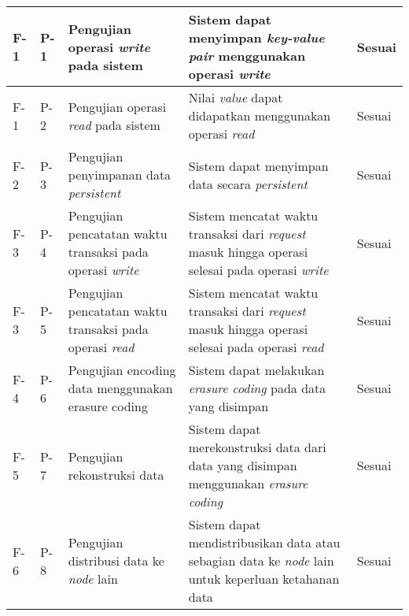 \begin{longtable}{|p{2cm}|p{2cm}|p{3cm}|p{3cm}|p{2cm}|}
	F-1                              & P-1          & Pengujian operasi \textit{write} pada sistem                     & Sistem dapat menyimpan \textit{key-value pair} menggunakan operasi \textit{write}                                                     & Sesuai                         \\ \hline
	F-1                              & P-2          & Pengujian operasi \textit{read} pada sistem                      & Nilai \textit{value} dapat didapatkan menggunakan operasi \textit{read}                                                               & Sesuai                         \\ \hline
	F-2                              & P-3          & Pengujian penyimpanan data \textit{persistent}                   & Sistem dapat menyimpan data secara \textit{persistent}                                                                                & Sesuai                         \\ \hline
	F-3                              & P-4          & Pengujian pencatatan waktu transaksi pada operasi \textit{write} & Sistem mencatat waktu transaksi dari \textit{request} masuk hingga operasi selesai pada operasi \textit{write}                        & Sesuai                         \\ \hline
	F-3                              & P-5          & Pengujian pencatatan waktu transaksi pada operasi \textit{read}  & Sistem mencatat waktu transaksi dari \textit{request} masuk hingga operasi selesai pada operasi \textit{read}                         & Sesuai                         \\ \hline
	F-4                              & P-6          & Pengujian encoding data menggunakan erasure coding               & Sistem dapat melakukan \textit{erasure coding} pada data yang disimpan                                                                & Sesuai                         \\ \hline
	F-5                              & P-7          & Pengujian rekonstruksi data                                      & Sistem dapat merekonstruksi data dari data yang disimpan menggunakan \textit{erasure coding}                                          & Sesuai                         \\ \hline
	F-6                              & P-8          & Pengujian distribusi data ke \textit{node} lain                  & Sistem dapat mendistribusikan data atau sebagian data ke \textit{node} lain untuk keperluan ketahanan data                            & Sesuai                         \\ \hline

\end{longtable}
